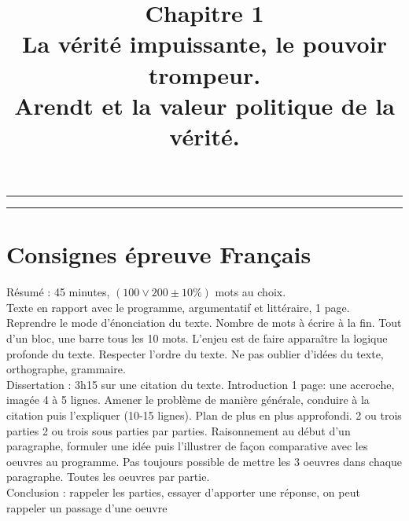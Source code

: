 \documentclass[12pt]{article}
\title{Chapitre 1\\\large La vérité impuissante, le pouvoir trompeur.\\Arendt et la valeur politique de la vérité.}
\date{}
\author{}
\begin{document}
\maketitle
\thispagestyle{fancy}
\hrule
\tableofcontents
\hrule
{}
\pagebreak
\section*{Consignes épreuve Français}
Résumé : 45 minutes, $(100 \vee 200 \pm10\%)$ mots au choix.\\
Texte en rapport avec le programme, argumentatif et littéraire, 1 page. Reprendre le mode d'énonciation du texte. Nombre de mots à écrire à la fin. Tout d'un bloc, une barre tous les 10 mots. L'enjeu est de faire apparaître la logique profonde du texte. Respecter l'ordre du texte. 
Ne pas oublier d'idées du texte, orthographe, grammaire.\\
Dissertation : 3h15 sur une citation du texte. Introduction 1 page: une accroche, imagée 4 à 5 lignes. Amener le problème de manière générale, conduire à la citation puis l'expliquer (10-15 lignes). Plan de plus en plus approfondi.
2 ou trois parties 2 ou trois sous parties par parties. Raisonnement au début d'un paragraphe, formuler une idée puis l'illustrer de façon comparative avec les oeuvres au programme. Pas toujours possible de mettre les 3 oeuvres dans chaque paragraphe. Toutes les oeuvres par partie.\\
Conclusion : rappeler les parties, essayer d'apporter une réponse, on peut rappeler un passage d'une oeuvre 
\pagebreak
\end{document}
